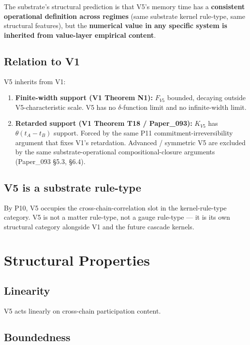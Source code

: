 \documentclass[11pt,a4paper]{article}
\begin{document}
The substrate's structural prediction is that V5's memory time has a \textbf{consistent operational definition across regimes} (same substrate kernel rule-type, same structural features), but the \textbf{numerical value in any specific system is inherited from value-layer empirical content}.

\subsection{Relation to V1}

V5 inherits from V1:

\begin{enumerate}[noitemsep]
\item \textbf{Finite-width support (V1 Theorem N1):} $F_{V5}$ bounded, decaying outside V5-characteristic scale. V5 has no $\delta$-function limit and no infinite-width limit.
\item \textbf{Retarded support (V1 Theorem T18 / Paper\_093):} $K_{V5}$ has $\theta(t_A - t_B)$ support. Forced by the same P11 commitment-irreversibility argument that fixes V1's retardation. Advanced / symmetric V5 are excluded by the same substrate-operational compositional-closure arguments (Paper\_093 \S5.3, \S6.4).
\end{enumerate}

\subsection{V5 is a substrate rule-type}

By P10, V5 occupies the cross-chain-correlation slot in the kernel-rule-type category. V5 is not a matter rule-type, not a gauge rule-type --- it is its own structural category alongside V1 and the future cascade kernels.

\section{Structural Properties}

\subsection{Linearity}

V5 acts linearly on cross-chain participation content.

\subsection{Boundedness}
\end{document}
